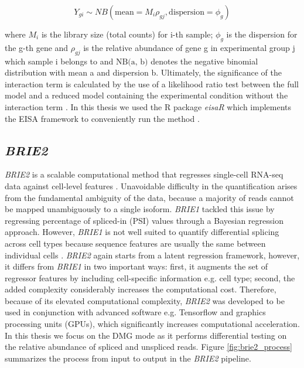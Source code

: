 \begin{equation}
Y_{gi} \sim NB(\text{mean} = M_{i}\rho_{gj}, \text{dispersion} = \phi_g)
\label{eqn:edger}
\end{equation}

where $M_i$ is the library size (total counts) for i-th sample; $\phi_g$ is the dispersion for the g-th gene and $\rho_{gj}$ is the relative abundance of gene g in experimental group j which sample i belongs to and $\text{NB(a, b)}$ denotes the negative binomial distribution with mean a and dispersion b. Ultimately, the significance of the interaction term is calculated by the use of a likelihood ratio test between the full model and a reduced model containing the experimental condition without the interaction term \citep{eisar}. In this thesis we used the R package \emph{eisaR} which implements the EISA framework to conveniently run the method \citep{eisar_package}.

\subsection{\emph{BRIE2}}
\emph{BRIE2} is a scalable computational method that regresses single-cell RNA-seq data against cell-level features \citep{brie2}. Unavoidable difficulty in the quantification arises from the fundamental ambiguity of the data, because a majority of reads cannot be mapped unambiguously to a single isoform. \emph{BRIE1} tackled this issue by regressing percentage of spliced-in (PSI) values through a Bayesian regression approach. However, \emph{BRIE1} is not well suited to quantify differential splicing across cell types because sequence features are usually the same between individual cells \citep{brie2}. \emph{BRIE2} again starts from a latent regression framework, however, it differs from \emph{BRIE1} in two important ways: first, it augments the set of regressor features by including cell-specific information e.g. cell type; second, the added complexity considerably increases the computational cost. Therefore, because of its elevated computational complexity, \emph{BRIE2} was developed to be used in conjunction with advanced software e.g. Tensorflow and graphics processing units (GPUs), which significantly increases computational acceleration. In this thesis we focus on the DMG mode as it performs differential testing on the relative abundance of spliced and unspliced reads. Figure \ref{fig:brie2_process} summarizes the process from input to output in the \emph{BRIE2} pipeline.

